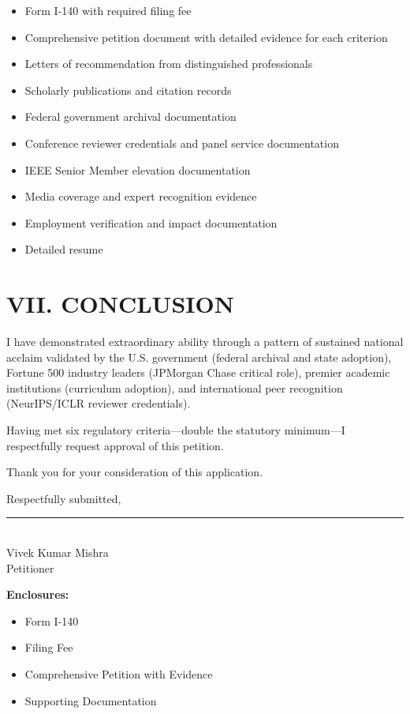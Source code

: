 \documentclass[11pt]{article}
\begin{document}
\begin{itemize}
    \item Form I-140 with required filing fee
    \item Comprehensive petition document with detailed evidence for each criterion
    \item Letters of recommendation from distinguished professionals
    \item Scholarly publications and citation records
    \item Federal government archival documentation
    \item Conference reviewer credentials and panel service documentation
    \item IEEE Senior Member elevation documentation
    \item Media coverage and expert recognition evidence
    \item Employment verification and impact documentation
    \item Detailed resume
\end{itemize}

\section*{VII. CONCLUSION}

I have demonstrated extraordinary ability through a pattern of sustained national acclaim validated by the U.S. government (federal archival and state adoption), Fortune 500 industry leaders (JPMorgan Chase critical role), premier academic institutions (curriculum adoption), and international peer recognition (NeurIPS/ICLR reviewer credentials).

Having met six regulatory criteria—double the statutory minimum—I respectfully request approval of this petition.

Thank you for your consideration of this application.

\vspace{2em}

Respectfully submitted,

\vspace{2em}

\rule{3in}{0.4pt}\\
Vivek Kumar Mishra\\
Petitioner

\vspace{1em}

\textbf{Enclosures:}
\begin{itemize}
    \item Form I-140
    \item Filing Fee
    \item Comprehensive Petition with Evidence
    \item Supporting Documentation
\end{itemize}
\end{document}

